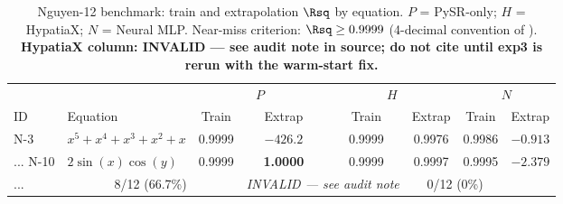 
\begin{table}[t]
\centering
\caption{Nguyen-12 benchmark: train and extrapolation $\Rsq$ by equation.
$P$ = PySR-only; $H$ = HypatiaX; $N$ = Neural MLP.
Near-miss criterion: $\Rsq \ge 0.9999$ (4-decimal convention of
\citealt{uy2011semantically}).
\textbf{HypatiaX column: INVALID — see audit note in source; do not cite
until exp3 is rerun with the warm-start fix.}}
\label{tab:nguyen12}
\begin{tabular}{l l cc cc cc}
\toprule
& & \multicolumn{2}{c}{$P$} & \multicolumn{2}{c}{$H$} & \multicolumn{2}{c}{$N$} \\
ID & Equation & Train & Extrap & Train & Extrap & Train & Extrap \\
\midrule
N-3  & $x^5 + x^4 + x^3 + x^2 + x$
  & 0.9999 & \emph{$-426.2$}
  & 0.9999 & 0.9976
  & 0.9986 & $-0.913$ \\
...
N-10 & $2\sin(x)\cos(y)$
  & 0.9999 & \textbf{1.0000}
  & 0.9999 & 0.9997
  & 0.9995 & $-2.379$ \\
...
\midrule
\multicolumn{2}{l}{Success ($\Rsq\ge0.9999$)}
  & \multicolumn{2}{c}{8/12 (66.7\%)}
  & \multicolumn{2}{c}{\textit{INVALID — see audit note}}
  & \multicolumn{2}{c}{0/12 (0\%)} \\
\bottomrule
\end{tabular}
\end{table}


